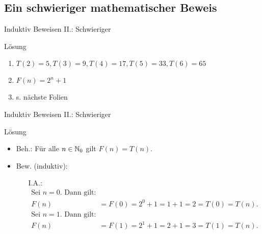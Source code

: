 \subsection{Ein schwieriger mathematischer Beweis}
\begin{frame}{Induktiv Beweisen II.: Schwieriger}
	\begin{block}{Lösung}
		\begin{enumerate}
			\item $ T(2)=5,T(3)=9, T(4)=17, T(5)=33, T(6)=65$
			\item $F(n) = 2^n+1$
			\item s. nächste Folien
		\end{enumerate}
	\end{block}
\end{frame}
\begin{frame}{Induktiv Beweisen II.: Schwieriger}
	\begin{block}{Lösung}
		 	\begin{itemize}
		 		\item Beh.: Für alle $n \in \mathbb{N}_0$ gilt $F(n) = T(n)$.
		 		\item Bew. (induktiv): 
				\begin{itemize}
					\item[I.A.:]\begin{align*} 
											\text{Sei }n=0 \text{. Dann gilt: } \\ 
												F(n)&=F(0)=2^0+1=1+1=2=T(0)=T(n).\\
							 				\text{Sei }n=1 \text{. Dann gilt:  } \\
							 					F(n)&=F(1)=2^1+1=2+1=3=T(1)=T(n).
							 \end{align*}
				\end{itemize}
		 	\end{itemize}				  
	\end{block}
\end{frame}
